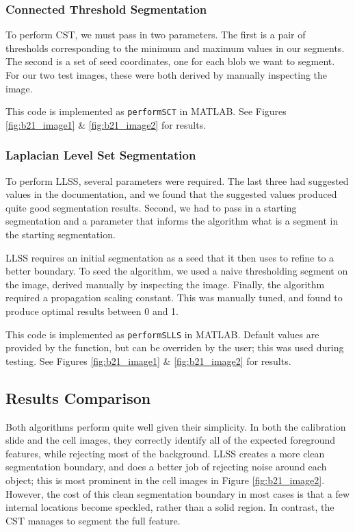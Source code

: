 \documentclass{article}
\begin{document}
\subsubsection*{Connected Threshold Segmentation}
To perform CST, we must pass in two parameters. The first is a pair of thresholds corresponding to the minimum and maximum values in our segments. The second is a set of seed coordinates, one for each blob we want to segment. For our two test images, these were both derived by manually inspecting the image.

This code is implemented as \texttt{performSCT} in MATLAB. See Figures \ref{fig:b21_image1} \& \ref{fig:b21_image2} for results.

\subsubsection*{Laplacian Level Set Segmentation}
To perform LLSS, several parameters were required. The last three had suggested values in the documentation, and we found that the suggested values produced quite good segmentation results. Second, we had to pass in a starting segmentation and a parameter that informs the algorithm what is a segment in the starting segmentation.

LLSS requires an initial segmentation as a seed that it then uses to refine to a better boundary. To seed the algorithm, we used a naive thresholding segment on the image, derived manually by inspecting the image. Finally, the algorithm required a propagation scaling constant. This was manually tuned, and found to produce optimal results between 0 and 1.

This code is implemented as \texttt{performSLLS} in MATLAB. Default values are provided by the function, but can be overriden by the user; this was used during testing. See Figures \ref{fig:b21_image1} \& \ref{fig:b21_image2} for results.

\subsection*{Results Comparison}
Both algorithms perform quite well given their simplicity. In both the calibration slide and the cell images, they correctly identify all of the expected foreground features, while rejecting most of the background. LLSS creates a more clean segmentation boundary, and does a better job of rejecting noise around each object; this is most prominent in the cell images in Figure \ref{fig:b21_image2}. However, the cost of this clean segmentation boundary in most cases is that a few internal locations become speckled, rather than a solid region. In contrast, the CST manages to segment the full feature.
\end{document}
